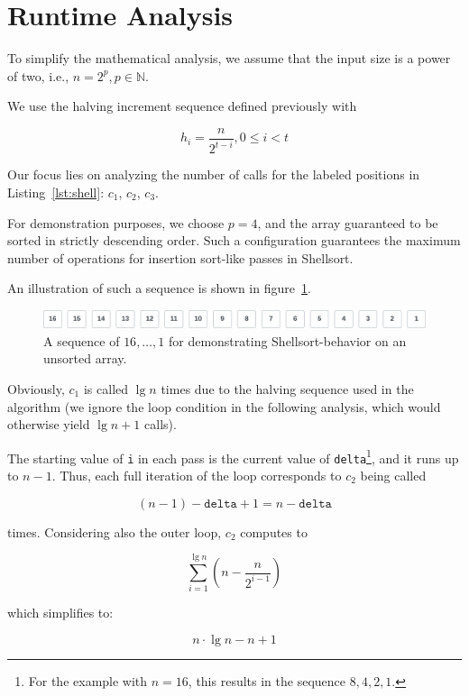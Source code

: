 \section{Runtime Analysis}

To simplify the mathematical analysis, we assume that the input size is a power of two, i.e., $n = 2^p, p \in \mathbb{N}$.



We use the halving increment sequence defined previously with

\[
    h_i = \frac{n}{2^{t-i}}, 0 \leq i < t
\]

Our focus lies on analyzing the number of calls for the labeled positions in Listing~\ref{lst:shell}: $c_1$, $c_2$, $c_3$.

For demonstration purposes, we choose $p=4$, and the array guaranteed to be sorted in strictly descending order.
Such a configuration guarantees the maximum number of operations for insertion sort-like passes in Shellsort.

An illustration of such a sequence is shown in figure~\ref{fig:bestcase}.


\begin{figure}[!h]
    \centering
    \includegraphics[width=1\columnwidth]{img/bestcase-sequence}
    \caption{A sequence of $16, \ldots, 1$ for demonstrating Shellsort-behavior on an unsorted array.}
    \label{fig:bestcase}
\end{figure}


Obviously, $c_1$ is called $\lg n$ times due to the halving sequence used in the algorithm (we ignore the loop condition in the following analysis, which would otherwise yield $\lg n + 1$ calls).

The starting value of \texttt{i} in each pass is the current value of \texttt{delta}\footnote{
For the example with $n = 16$, this results in the sequence $8, 4, 2, 1$.
}, and it runs up to $n - 1$.
Thus, each full iteration of the loop corresponds to $c_2$ being called

\[
(n - 1) - \texttt{delta} + 1 = n - \texttt{delta}
\]

\noindent
times.
Considering also the outer loop, $c_2$ computes to

\[
\sum_{i=1}^{\lg n} \left( n - \frac{n}{2^{i-1}} \right)
\]

\noindent
which simplifies to:

\[
n \cdot \lg n - n + 1
\]

